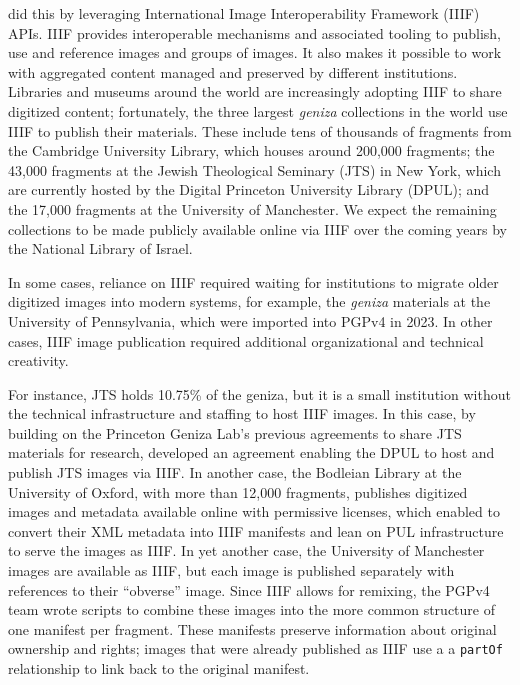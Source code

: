 \documentclass{article}
\begin{document}
 did this by leveraging International Image Interoperability Framework (IIIF) APIs. IIIF provides interoperable mechanisms and associated tooling to publish, use and reference images and groups of images. It also makes it possible to work with aggregated content managed and preserved by different institutions. Libraries and museums around the world are increasingly adopting IIIF to share digitized content; fortunately, the three largest \textit{geniza} collections in the world use IIIF to publish their materials. These include tens of thousands of fragments from the Cambridge University Library, which houses around 200,000 fragments; the 43,000 fragments at the Jewish Theological Seminary (JTS) in New York, which are currently hosted by the Digital Princeton University Library (DPUL); and the 17,000 fragments at the University of Manchester. We expect the remaining collections to be made publicly available online via IIIF over the coming years by the National Library of Israel.

In some cases, reliance on IIIF required waiting for institutions to migrate older digitized images into modern systems, for example, the \textit{geniza} materials at the University of Pennsylvania, which were imported into PGPv4 in 2023. In other cases, IIIF image publication required additional organizational and technical creativity. 

For instance, JTS holds 10.75\% of the geniza, but it is a small institution without the technical infrastructure and staffing to host IIIF images. In this case, by building on the Princeton Geniza Lab’s previous agreements to share JTS materials for research,  developed an agreement enabling the DPUL to host and publish JTS images via IIIF. In another case, the Bodleian Library at the University of Oxford, with more than 12,000 fragments, publishes digitized images and metadata available online with permissive licenses, which enabled  to convert their XML metadata into IIIF manifests and lean on PUL infrastructure to serve the images as IIIF. In yet another case, the University of Manchester images are available as IIIF, but each image is published separately with references to their “obverse” image. Since IIIF allows for remixing, the PGPv4 team wrote scripts to combine these images into the more common structure of one manifest per fragment. These manifests preserve information about original ownership and rights; images that were already published as IIIF use a a \texttt{partOf} relationship to link back to the original manifest.
\end{document}
